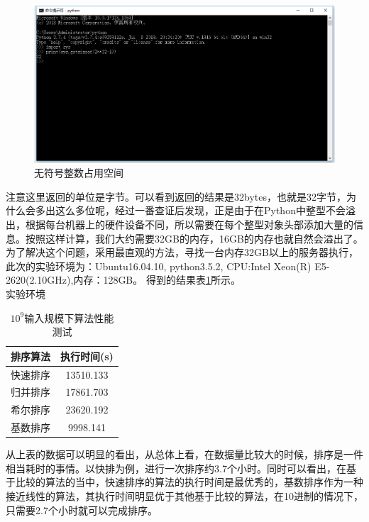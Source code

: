 \documentclass[UTF8]{ctexart}
\begin{document}
\begin{figure}[H]
    \centering
    \includegraphics[width=1\textwidth]{img/size.png}
    \caption{无符号整数占用空间}
    \label{size}
\end{figure}

注意这里返回的单位是字节。可以看到返回的结果是32bytes，也就是32字节，为什么会多出这么多位呢，经过一番查证后发现，正是由于在Python中整型不会溢出，根据每台机器上的硬件设备不同，所以需要在每个整型对象头部添加大量的信息。按照这样计算，我们大约需要32GB的内存，16GB的内存也就自然会溢出了。\\

为了解决这个问题，采用最直观的方法，寻找一台内存32GB以上的服务器执行，此次的实验环境为：Ubuntu16.04.10, python3.5.2, CPU:Intel Xeon(R) E5-2620(2.10GHz),内存：128GB。
得到的结果表\ref{table-1}所示。\\
实验环境

\begin{table}[H]
    \caption{$10^9$输入规模下算法性能测试}
    \label{table-1}
    \begin{center}
        \begin{tabular}{cc}
            \hline
            排序算法&   执行时间(s)\\     
            \hline
            快速排序&       13510.133\\               
            归并排序&       17861.703\\              
            希尔排序&       23620.192\\             
            基数排序&      9998.141\\                      
            \hline
        \end{tabular}  
    \end{center}
\end{table}

从上表的数据可以明显的看出，从总体上看，在数据量比较大的时候，排序是一件相当耗时的事情。以快排为例，进行一次排序约3.7个小时。同时可以看出，在基于比较的算法的当中，快速排序的算法的执行时间是最优秀的，基数排序作为一种接近线性的算法，其执行时间明显优于其他基于比较的算法，在10进制的情况下，只需要2.7个小时就可以完成排序。
\end{document}
